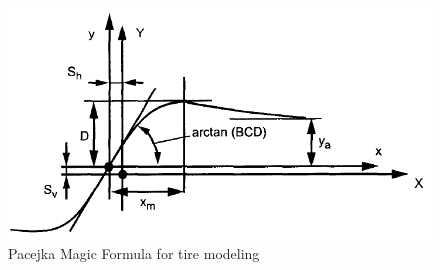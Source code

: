 \begin{figure}[h!]
	\centering
		\includegraphics[scale=0.4]{figure/Magic_Formula.png}
	\caption{ Pacejka Magic Formula for tire modeling}
    	\label{fig:MagicFit}
\end{figure}
